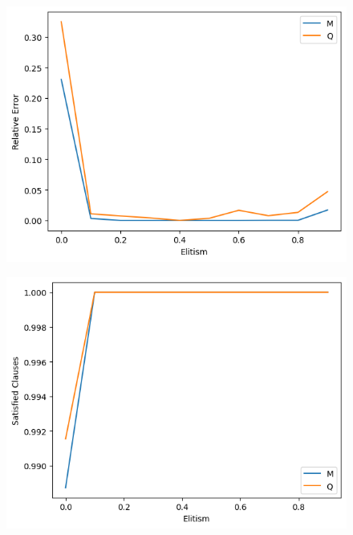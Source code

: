 \documentclass[12pt]{article}
\begin{document}
\begin{figure}[H]
    \centering
    \begin{minipage}[b]{0.5\textwidth}
        \centering
        \includegraphics[width=\textwidth]{images/elitism_relative_error.png}
        \label{fig:elitism_relative_error}
    \end{minipage}%
    \hfill
    \begin{minipage}[b]{0.5\textwidth}
        \centering
        \includegraphics[width=\textwidth]{images/elitism_satisfied_clauses.png}
        \label{fig:elitism_satisfied_clauses}
    \end{minipage}
\end{figure}
\end{document}
